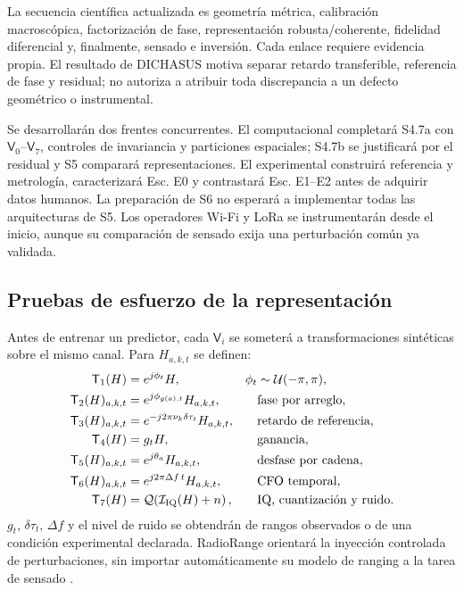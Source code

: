 La secuencia científica actualizada es geometría métrica, calibración macroscópica,
factorización de fase, representación robusta/coherente, fidelidad diferencial y,
finalmente, sensado e inversión. Cada enlace requiere evidencia propia. El resultado
de DICHASUS motiva separar retardo transferible, referencia de fase y residual;
no autoriza a atribuir toda discrepancia a un defecto geométrico o instrumental.

Se desarrollarán dos frentes concurrentes. El computacional completará S4.7a con
$\mathsf V_0$--$\mathsf V_7$, controles de invariancia y particiones espaciales;
S4.7b se justificará por el residual y S5 comparará representaciones. El experimental
construirá referencia y metrología, caracterizará Esc. E0 y contrastará Esc. E1--E2
antes de adquirir datos humanos. La preparación de S6 no esperará a implementar todas
las arquitecturas de S5. Los operadores Wi-Fi y LoRa se instrumentarán desde el inicio,
aunque su comparación de sensado exija una perturbación común ya validada.

\subsection{Pruebas de esfuerzo de la representación}
\label{sec:representation_stress_tests}

Antes de entrenar un predictor, cada $\mathsf V_i$ se someterá a transformaciones
sintéticas sobre el mismo canal. Para $H_{a,k,t}$ se definen:
\begin{align}
\mathsf T_1(H)&=e^{j\phi_t}H,
&\phi_t&\sim\mathcal U(-\pi,\pi),\nonumber\\
\mathsf T_2(H)_{a,k,t}&=e^{j\phi_{g(a),t}}H_{a,k,t},
&&\text{fase por arreglo},\nonumber\\
\mathsf T_3(H)_{a,k,t}&=e^{-j2\pi\nu_k\delta\tau_t}H_{a,k,t},
&&\text{retardo de referencia},\nonumber\\
\mathsf T_4(H)&=g_tH,
&&\text{ganancia},\label{eq:s47_stress_transforms}\\
\mathsf T_5(H)_{a,k,t}&=e^{j\theta_a}H_{a,k,t},
&&\text{desfase por cadena},\nonumber\\
\mathsf T_6(H)_{a,k,t}&=e^{j2\pi\Delta f\,t}H_{a,k,t},
&&\text{CFO temporal},\nonumber\\
\mathsf T_7(H)&=\mathcal Q\!\left(\mathcal I_{\rm IQ}(H)+n\right),
&&\text{IQ, cuantización y ruido}.\nonumber
\end{align}
$g_t$, $\delta\tau_t$, $\Delta f$ y el nivel de ruido se obtendrán de rangos
observados o de una condición experimental declarada. RadioRange orientará la
inyección controlada de perturbaciones, sin importar automáticamente su modelo de
ranging a la tarea de sensado \citep{Lyu2026RadioRange}.

